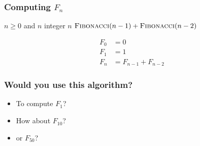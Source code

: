 \documentclass[presentation]{beamer}
\begin{document}
\begin{frame}
  \frametitle{Computing $F_n$}
  \begin{algorithmic}
    \Require $n \ge 0$ and $n$ integer
     
    \State \Return $n$
    \Else
    \State \Return $\textsc{Fibonacci}(n-1) + \textsc{Fibonacci}(n-2)$
    \EndIf
    \EndFunction
  \end{algorithmic}
  \begin{align*}
    F_0 &= 0\\
    F_1 &= 1\\
    F_n &= F_{n-1} + F_{n-2}
  \end{align*}
\end{frame}

\begin{frame}
  \frametitle{Would you use this algorithm?}
  \begin{itemize}
  \item<1-> To compute $F_1$?
  \item<2-> How about $F_{10}$?
  \item<3-> or $F_{50}$?
  \end{itemize}


\end{frame}
\end{document}
